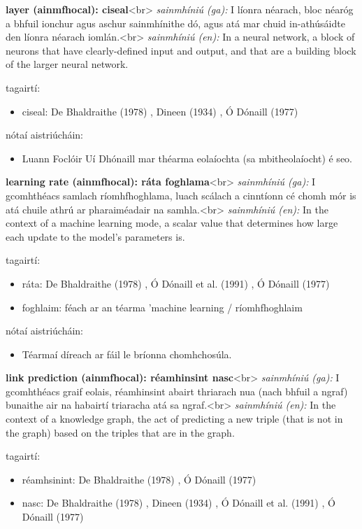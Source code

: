 \documentclass{article}
\begin{document}
\textbf{layer (ainmfhocal): ciseal}<br>
\textit{sainmhíniú (ga):} I líonra néarach, bloc néaróg a bhfuil ionchur agus aschur sainmhínithe dó, agus atá mar chuid in-athúsáidte den líonra néarach iomlán.<br>
\textit{sainmhíniú (en):} In a neural network, a block of neurons that have clearly-defined input and output, and that are a building block of the larger neural network.

tagairtí:
\begin{itemize}
	\item ciseal: De Bhaldraithe (1978) \cite{de-bhaldraithe}, Dineen (1934) \cite{dineen}, Ó Dónaill (1977) \cite{odonaill}
\end{itemize}

nótaí aistriúcháin:
\begin{itemize}
	\item Luann Foclóir Uí Dhónaill mar théarma eolaíochta (sa mbitheolaíocht) é seo.
\end{itemize}


\textbf{learning rate (ainmfhocal): ráta foghlama}<br>
\textit{sainmhíniú (ga):} I gcomhthéacs samlach ríomhfhoghlama, luach scálach a cinntíonn cé chomh mór is atá chuile athrú ar pharaiméadair na samhla.<br>
\textit{sainmhíniú (en):} In the context of a machine learning mode, a scalar value that determines how large each update to the model's parameters is.

tagairtí:
\begin{itemize}
	\item ráta: De Bhaldraithe (1978) \cite{de-bhaldraithe}, Ó Dónaill et al. (1991) \cite{focloir-beag}, Ó Dónaill (1977) \cite{odonaill}
	\item foghlaim: féach ar an téarma 'machine learning / ríomhfhoghlaim
\end{itemize}

nótaí aistriúcháin:
\begin{itemize}
	\item Téarmaí díreach ar fáil le bríonna chomhchosúla.
\end{itemize}


\textbf{link prediction (ainmfhocal): réamhinsint nasc}<br>
\textit{sainmhíniú (ga):} I gcomhthéacs graif eolais, réamhinsint abairt thriarach nua (nach bhfuil a ngraf) bunaithe air na habairtí triaracha atá sa ngraf.<br>
\textit{sainmhíniú (en):} In the context of a knowledge graph, the act of predicting a new triple (that is not in the graph) based on the triples that are in the graph.

tagairtí:
\begin{itemize}
	\item réamhsinint: De Bhaldraithe (1978) \cite{de-bhaldraithe}, Ó Dónaill (1977) \cite{odonaill}
	\item nasc: De Bhaldraithe (1978) \cite{de-bhaldraithe}, Dineen (1934) \cite{dineen}, Ó Dónaill et al. (1991) \cite{focloir-beag}, Ó Dónaill (1977) \cite{odonaill}
\end{itemize}
\end{document}
